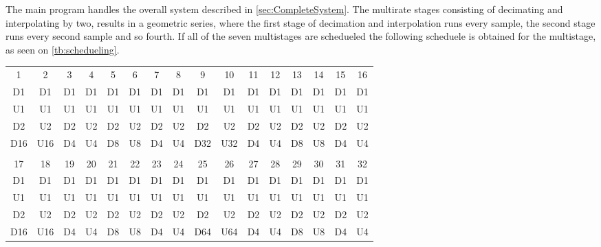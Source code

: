 The main program handles the overall system described in \autoref{sec:CompleteSystem}. The multirate stages consisting of decimating and interpolating by two, results in a geometric series, where the first stage of decimation and interpolation runs every sample, the second stage runs every second sample and so fourth. If all of the seven multistages are schedueled the following scheduele is obtained for the multistage, as seen on \autoref{tb:schedueling}.    



\begin{table}[H]
\centering
\begin{tabular}{|c|c|c|c|c|c|c|c|c|c|c|c|c|c|c|c|}
\hline
\rowcolor[HTML]{C0C0C0} 
\multicolumn{16}{|c|}{\cellcolor[HTML]{C0C0C0}Sample}                             \\ \hline
\rowcolor[HTML]{C0C0C0} 
1   & 2   & 3  & 4  & 5  & 6  & 7  & 8  & 9   & 10  & 11 & 12 & 13 & 14 & 15 & 16 \\ \hline
D1  & D1  & D1 & D1 & D1 & D1 & D1 & D1 & D1  & D1  & D1 & D1 & D1 & D1 & D1 & D1 \\ \hline
U1  & U1  & U1 & U1 & U1 & U1 & U1 & U1 & U1  & U1  & U1 & U1 & U1 & U1 & U1 & U1 \\ \hline
D2  & U2  & D2 & U2 & D2 & U2 & D2 & U2 & D2  & U2  & D2 & U2 & D2 & U2 & D2 & U2 \\ \hline
D16 & U16 & D4 & U4 & D8 & U8 & D4 & U4 & D32 & U32 & D4 & U4 & D8 & U8 & D4 & U4 \\ \hline
\rowcolor[HTML]{C0C0C0} 
\multicolumn{16}{|c|}{\cellcolor[HTML]{C0C0C0}Sample}                             \\ \hline
\rowcolor[HTML]{C0C0C0} 
17  & 18  & 19 & 20 & 21 & 22 & 23 & 24 & 25  & 26  & 27 & 28 & 29 & 30 & 31 & 32 \\ \hline
D1  & D1  & D1 & D1 & D1 & D1 & D1 & D1 & D1  & D1  & D1 & D1 & D1 & D1 & D1 & D1 \\ \hline
U1  & U1  & U1 & U1 & U1 & U1 & U1 & U1 & U1  & U1  & U1 & U1 & U1 & U1 & U1 & U1 \\ \hline
D2  & U2  & D2 & U2 & D2 & U2 & D2 & U2 & D2  & U2  & D2 & U2 & D2 & U2 & D2 & U2 \\ \hline
D16 & U16 & D4 & U4 & D8 & U8 & D4 & U4 & D64 & U64 & D4 & U4 & D8 & U8 & D4 & U4 \\ \hline

\end{tabular}
\end{table}
